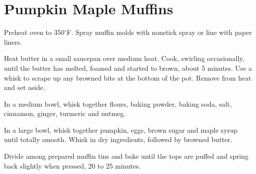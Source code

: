 \section{Pumpkin Maple Muffins}
\begin{recipe}
	
	
	
	Preheat oven to 350$^{\circ}$F. Spray muffin molds with nonstick spray or line with paper liners.
	
	Heat butter in a small saucepan over medium heat. Cook, swirling occasionally, until the butter has melted, foamed and started to brown, about 5 minutes. Use a whisk to scrape up any browned bits at the bottom of the pot. Remove from heat and set aside.
	
	In a medium bowl, whisk together flours, baking powder, baking soda, salt, cinnamon, ginger, turmeric and nutmeg.
	
	In a large bowl, whisk together pumpkin, eggs, brown sugar and maple syrup until totally smooth. Whisk in dry ingredients, followed by browned butter.
	
	Divide among prepared muffin tins and bake until the tops are puffed and spring back slightly when pressed, 20 to 25 minutes.
	
\end{recipe}

